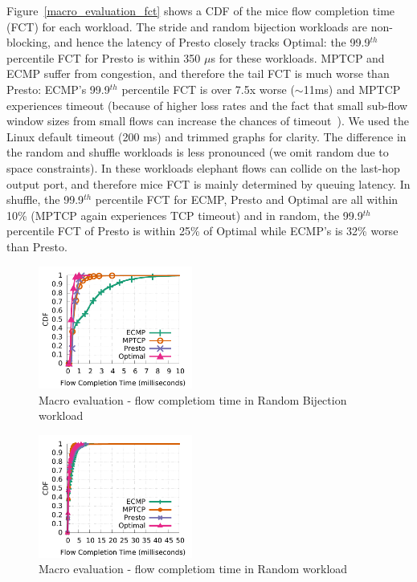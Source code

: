 Figure~\ref{macro_evaluation_fct} shows a CDF of the mice flow completion time (FCT) for each workload.
The stride and random bijection workloads are non-blocking, and hence the latency of Presto
closely tracks Optimal: the 99.9$^{th}$ percentile FCT for Presto is within 350 $\mu$s for these workloads.
MPTCP and ECMP suffer from congestion, and therefore the tail FCT is much worse than Presto: ECMP's 99.9$^{th}$ percentile
FCT is over 7.5x worse ($\sim$11ms) and MPTCP experiences timeout (because of higher loss
rates and the fact that small sub-flow window sizes from small flows can increase the chances of timeout~\cite{dc-mptcp}). We used the Linux default timeout (200 ms) and trimmed graphs for clarity.
The difference in the random and shuffle workloads is less pronounced (we omit random due to space constraints).
In these workloads elephant flows can collide on the last-hop output port,
and therefore mice FCT is mainly determined by queuing latency. In shuffle, the 99.9$^{th}$ percentile FCT for ECMP, Presto and Optimal
are all within 10\% (MPTCP again experiences TCP timeout) and in random, the 99.9$^{th}$ percentile FCT of Presto is within 25\% of Optimal while ECMP's 
is 32\% worse than Presto.


\iffalse
\begin{figure}[!t]
        \centering
  \includegraphics[width=0.45\textwidth]{presto/figures/macro/bijection/macro_compare_fct_bijection_mice.pdf}
        \caption{Macro evaluation - flow completiom time in Random Bijection workload}
        \label{macro_evaluation_fct_bijection}
\end{figure}

\begin{figure}[!t]
        \centering
  \includegraphics[width=0.45\textwidth]{presto/figures/macro/random/macro_compare_fct_random_mice.pdf}
        \caption{Macro evaluation - flow completiom time in Random workload}
        \label{macro_evaluation_fct_random}
\end{figure}


